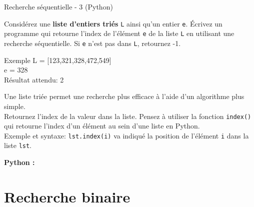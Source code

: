 \begin{Exercice}[10 minutes] Recherche séquentielle - 3 (Python)\\


    Considérez une \textbf{liste d’entiers triés} \lstinline{L} ainsi qu’un entier \lstinline{e}. Écrivez un programme qui retourne l'index de l'élément \lstinline{e} de la liste \lstinline{L} en utilisant une recherche séquentielle. Si \lstinline{e} n’est pas dans \lstinline{L}, retournez -1.\\
    
    \begin{Example}{\faTerminal Exemple}
        L = [123,321,328,472,549] \\
        e = 328 \\
        Résultat attendu: 2\\
    \end{Example}
  


    \begin{conseil}
        Une liste triée permet une recherche plus efficace à l'aide d'un algorithme plus simple.\\
        Retournez l'index de la valeur dans la liste. Pensez à utiliser la fonction \lstinline{index()} qui retourne l'index d'un élément au sein d'une liste en Python.\\Exemple et syntaxe: \lstinline{lst.index(i)} va indiqué la position de l'élément \lstinline{i} dans la liste \lstinline{lst}.
    \end{conseil}


    \begin{solution}
        \textbf{Python :}
        
    \end{solution}
\end{Exercice}


\newpage
\section{Recherche binaire}

